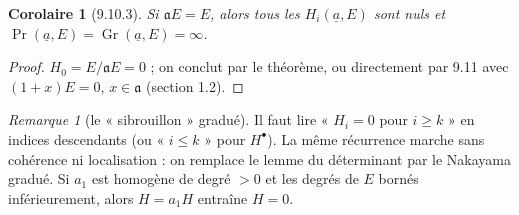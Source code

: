 \documentclass[11pt]{amsart}
\newtheorem{corollary}[theorem]{Corolaire}
\theoremstyle{definition}
\theoremstyle{remark}
\newtheorem{remark}[theorem]{Remarque}
\DeclareMathOperator{\Gr}{Gr}
\renewcommand{\Pr}{\operatorname{Pr}}
\newcommand{\ua}{\underline{a}}
\newcommand{\fa}{\mathfrak{a}}
\begin{document}
\begin{corollary}[9.10.3]
Si $\fa E=E$, alors tous les $H_i(\ua,E)$ sont nuls et
$\Pr(\ua,E)=\Gr(\ua,E)=\infty$.
\end{corollary}
\begin{proof}
$H_0=E/\fa E=0$ ; on conclut par le théorème, ou directement par 9.11 avec
$(1+x)E=0$, $x\in\fa$ (section 1.2).
\end{proof}

\begin{remark}[le « sibrouillon » gradué]
Il faut lire « $H_i=0$ pour $i\ge k$ » en indices descendants (ou
« $i\le k$ » pour $H^\bullet$). La même récurrence marche sans cohérence ni
localisation : on remplace le lemme du déterminant par le Nakayama gradué.
Si $a_1$ est homogène de degré $>0$ et les degrés de $E$ bornés
inférieurement, alors $H=a_1H$ entraîne $H=0$.
\end{remark}
\end{document}
